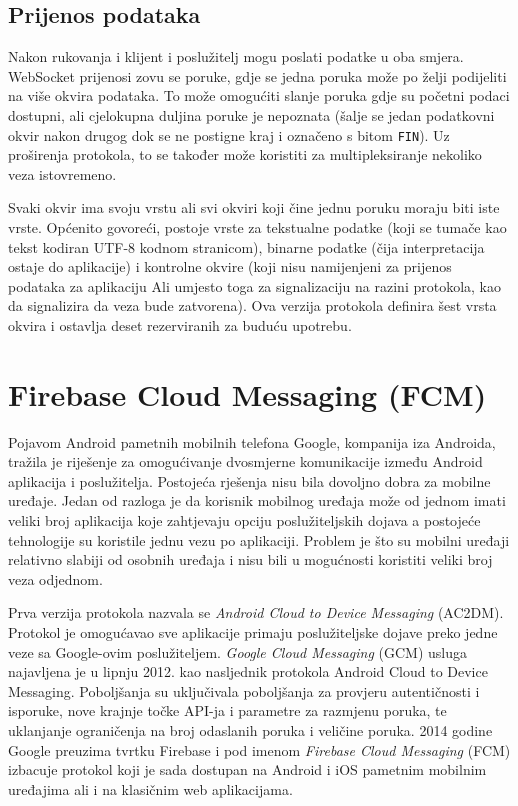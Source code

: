 \documentclass[times, utf8, zavrsni]{fer}
\begin{document}
\subsection{Prijenos podataka}
Nakon rukovanja i klijent i poslužitelj mogu poslati podatke u oba smjera. WebSocket prijenosi zovu se poruke, gdje se jedna poruka može po želji podijeliti na više okvira podataka. To može omogućiti slanje poruka gdje su početni podaci dostupni, ali cjelokupna duljina poruke je nepoznata (šalje se jedan podatkovni okvir nakon drugog dok se ne postigne kraj i označeno s bitom {\tt FIN}). Uz proširenja protokola, to se također može koristiti za multipleksiranje nekoliko veza istovremeno. 

Svaki okvir ima svoju vrstu ali svi okviri koji čine jednu poruku moraju biti iste vrste. Općenito govoreći, postoje vrste za tekstualne podatke (koji se tumače kao tekst kodiran UTF-8 kodnom stranicom), binarne podatke (čija interpretacija ostaje do aplikacije) i kontrolne okvire (koji nisu namijenjeni za prijenos podataka za aplikaciju Ali umjesto toga za signalizaciju na razini protokola, kao da signalizira da veza bude zatvorena). Ova verzija protokola definira šest vrsta okvira i ostavlja deset rezerviranih za buduću upotrebu.

\section{Firebase Cloud Messaging (FCM)}

Pojavom Android pametnih mobilnih telefona Google, kompanija iza Androida, tražila je riješenje za omogućivanje dvosmjerne komunikacije između Android aplikacija i poslužitelja. Postojeća rješenja nisu bila dovoljno dobra za mobilne uređaje. Jedan od razloga je da korisnik mobilnog uređaja može od jednom imati veliki broj aplikacija koje zahtjevaju opciju poslužiteljskih dojava a postojeće tehnologije su koristile jednu vezu po aplikaciji. Problem je što su mobilni uređaji relativno slabiji od osobnih uređaja i nisu bili u mogućnosti koristiti veliki broj veza odjednom.

Prva verzija protokola nazvala se {\em Android Cloud to Device Messaging} (AC2DM). Protokol je omogućavao sve aplikacije primaju poslužiteljske dojave preko jedne veze sa Google-ovim poslužiteljem. {\em Google Cloud Messaging} (GCM) usluga najavljena je u lipnju 2012. kao nasljednik protokola Android Cloud to Device Messaging. Poboljšanja su uključivala poboljšanja za provjeru autentičnosti i isporuke, nove krajnje točke API-ja i parametre za razmjenu poruka, te uklanjanje ograničenja na broj odaslanih poruka i veličine poruka. 2014 godine Google preuzima tvrtku Firebase i pod imenom {\em Firebase Cloud Messaging} (FCM) izbacuje protokol koji je sada dostupan na Android i iOS pametnim mobilnim uređajima ali i na klasičnim web aplikacijama.
\end{document}
